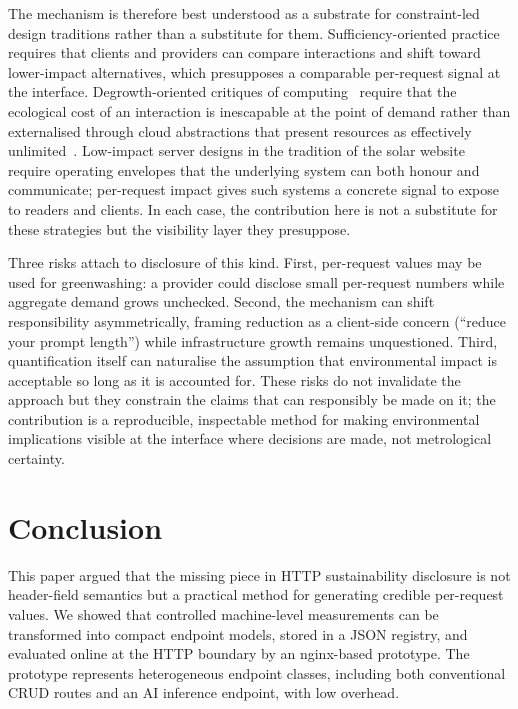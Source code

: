 \documentclass[sigconf]{acmart}
\begin{document}
The mechanism is therefore best understood as a substrate for constraint-led design traditions rather than a substitute for them. Sufficiency-oriented practice~\cite{pargman2014rethinking,nardi2018computingwithinlimits} requires that clients and providers can compare interactions and shift toward lower-impact alternatives, which presupposes a comparable per-request signal at the interface. Degrowth-oriented critiques of computing~\cite{becker2023insolvent} require that the ecological cost of an interaction is inescapable at the point of demand rather than externalised through cloud abstractions that present resources as effectively unlimited~\cite{mytton2020hiding}. Low-impact server designs in the tradition of the solar website~\cite{dedecker2018solar} require operating envelopes that the underlying system can both honour and communicate; per-request impact gives such systems a concrete signal to expose to readers and clients. In each case, the contribution here is not a substitute for these strategies but the visibility layer they presuppose.

Three risks attach to disclosure of this kind. First, per-request values may be used for greenwashing: a provider could disclose small per-request numbers while aggregate demand grows unchecked. Second, the mechanism can shift responsibility asymmetrically, framing reduction as a client-side concern (``reduce your prompt length'') while infrastructure growth remains unquestioned. Third, quantification itself can naturalise the assumption that environmental impact is acceptable so long as it is accounted for. These risks do not invalidate the approach but they constrain the claims that can responsibly be made on it; the contribution is a reproducible, inspectable method for making environmental implications visible at the interface where decisions are made, not metrological certainty.

\section{Conclusion}
This paper argued that the missing piece in HTTP sustainability disclosure is not header-field semantics but a practical method for generating credible per-request values. We showed that controlled machine-level measurements can be transformed into compact endpoint models, stored in a JSON registry, and evaluated online at the HTTP boundary by an nginx-based prototype. The prototype represents heterogeneous endpoint classes, including both conventional CRUD routes and an AI inference endpoint, with low overhead.
\end{document}

